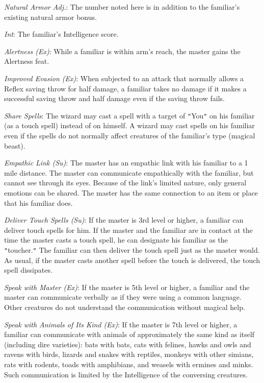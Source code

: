 \textit{Natural Armor Adj.}: The number noted here is in addition to the familiar's existing natural armor bonus.
				
\textit{Int}: The familiar's Intelligence score.
				
\textit{Alertness (Ex)}: While a familiar is within arm's reach, the master gains the Alertness feat.
				
\textit{Improved Evasion (Ex)}: When subjected to an attack that normally allows a Reflex saving throw for half damage, a familiar takes no damage if it makes a successful saving throw and half damage even if the saving throw fails.
				
\textit{Share Spells}: The wizard may cast a spell with a target of \texttt{{}"{}}You\texttt{{}"{}} on his familiar (as a touch spell) instead of on himself. A wizard may cast spells on his familiar even if the spells do not normally affect creatures of the familiar's type (magical beast).
				
\textit{Empathic Link (Su)}: The master has an empathic link with his familiar to a 1 mile distance. The master can communicate empathically with the familiar, but cannot see through its eyes. Because of the link's limited nature, only general emotions can be shared. The master has the same connection to an item or place that his familiar does.
				
\textit{Deliver Touch Spells (Su)}: If the master is 3rd level or higher, a familiar can deliver touch spells for him. If the master and the familiar are in contact at the time the master casts a touch spell, he can designate his familiar as the \texttt{{}"{}}toucher.\texttt{{}"{}} The familiar can then deliver the touch spell just as the master would. As usual, if the master casts another spell before the touch is delivered, the touch spell dissipates.
				
\textit{Speak with Master (Ex)}: If the master is 5th level or higher, a familiar and the master can communicate verbally as if they were using a common language. Other creatures do not understand the communication without magical help.
				
\textit{Speak with Animals of Its Kind (Ex)}: If the master is 7th level or higher, a familiar can communicate with animals of approximately the same kind as itself (including dire varieties): bats with bats, cats with felines, hawks and owls and ravens with birds, lizards and snakes with reptiles, monkeys with other simians, rats with rodents, toads with amphibians, and weasels with ermines and minks. Such communication is limited by the Intelligence of the conversing creatures.
				
